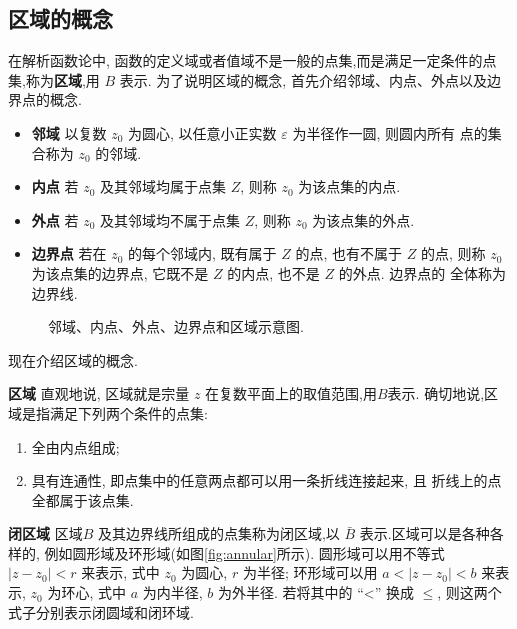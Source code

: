 



\subsection{区域的概念}
\label{sub:domain}
在解析函数论中, 函数的定义域或者值域不是一般的点集,而是满足一定条件的点集,称为{\bf 区域},用 $B$ 表示.
为了说明区域的概念, 首先介绍邻域、内点、外点以及边界点的概念.

\begin{itemize}
\item {\bf 邻域} \quad 以复数 $z_0$ 为圆心, 以任意小正实数 $\varepsilon$ 为半径作一圆, 则圆内所有 点的集合称为 $z_0$ 的邻域.
\item {\bf 内点} \quad 若 $z_0$ 及其邻域均属于点集 $Z$, 则称 $z_0$ 为该点集的内点.
\item {\bf 外点} \quad 若 $z_0$ 及其邻域均不属于点集 $Z$, 则称 $z_0$ 为该点集的外点.
\item {\bf 边界点}  \quad 若在 $z_0$ 的每个邻域内, 既有属于 $Z$ 的点, 也有不属于 $Z$ 的点, 
        则称 $z_0$ 为该点集的边界点, 它既不是 $Z$ 的内点, 也不是 $Z$ 的外点. 边界点的 全体称为边界线.
\end{itemize}

\begin{figure}[htb]
    \centering
    
    \caption{邻域、内点、外点、边界点和区域示意图.}
    \label{fig:region}
\end{figure}

现在介绍区域的概念. 

\textbf{区域} \quad 直观地说,  区域就是宗量 $z$ 在复数平面上的取值范围,用$B$表示. 
确切地说,区域是指满足下列两个条件的点集:
    \begin{enumerate}
        \item 全由内点组成;
        \item 具有连通性, 即点集中的任意两点都可以用一条折线连接起来, 且 折线上的点全都属于该点集.
    \end{enumerate}

\textbf{闭区域} \quad 区域$B$ 及其边界线所组成的点集称为闭区域,以 $\bar{B}$ 表示.区域可以是各种各样的, 例如圆形域及环形域(如图\ref{fig:annular}所示). 
圆形域可以用不等式 $\left|z-z_0\right|<r$ 来表示, 式中 $z_0$ 为圆心, $r$ 为半径; 
环形域可以用 $a<\left|z-z_0\right|<b$ 来表示, $z_0$ 为环心, 式中 $a$ 为内半径, $b$ 为外半径.
 若将其中的 ``<'' 换成 $\leqslant$, 则这两个式子分别表示闭圆域和闭环域.

